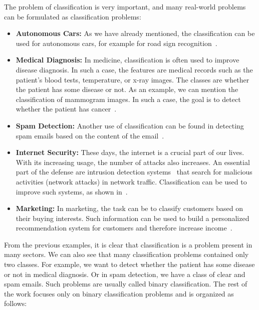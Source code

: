 The problem of classification is very important, and many real-world problems can be formulated as classification problems:
\begin{itemize}
  \item \textbf{Autonomous Cars:} As we have already mentioned, the classification can be used for autonomous cars, for example for road sign recognition~\cite{swaminathan2019autonomous}.
  \item \textbf{Medical Diagnosis:} In medicine, classification is often used to improve disease diagnosis. In such a case, the features are medical records such as the patient's blood tests, temperature, or x-ray images. The classes are whether the patient has some disease or not. As an example, we can mention the classification of mammogram images. In such a case, the goal is to detect whether the patient has cancer~\cite{viale2012current, levy2016breast}.
  \item \textbf{Spam Detection:} Another use of classification can be found in detecting spam emails based on the content of the email~\cite{pantel1998spamcop}.
  \item \textbf{Internet Security:} These days, the internet is a crucial part of our lives. With its increasing usage, the number of attacks also increases. An essential part of the defense are intrusion detection systems~\cite{grill2016learning, scarfone2007guide} that search for malicious activities (network attacks) in network traffic. Classification can be used to improve such systems, as shown in~\cite{giacinto2002intrusion, shanbhag2009accurate}.
  \item \textbf{Marketing:} In marketing, the task can be to classify customers based on their buying interests. Such information can be used to build a personalized recommendation system for customers and therefore increase income~\cite{kaefer2005neural, zhang2007building}.
\end{itemize}
From the previous examples, it is clear that classification is a problem present in many sectors. We can also see that many classification problems contained only two classes. For example, we want to detect whether the patient has some disease or not in medical diagnosis. Or in spam detection, we have a class of clear and spam emails. Such problems are usually called binary classification. The rest of the work focuses only on binary classification problems and is organized as follows:
